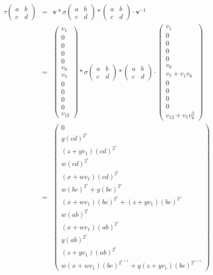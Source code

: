 \begin{eqnarray*}
\tau\left(\begin{matrix} a & b \\ c & d \end{matrix}\right) &=&
\mathbf{v}*\sigma\left(\begin{matrix} a & b \\ c & d \end{matrix}\right) *
\left(\begin{matrix} a & b \\ c & d \end{matrix}\right) \cdot \mathbf{v}^{-1}\\
&=&
\left(\begin{matrix} 
v_1  \\
0 \\
0 \\
0 \\
0 \\
v_6 \\
v_7 \\
0 \\
0 \\
0 \\
0 \\
v_{12}
\end{matrix}\right)
*\sigma\left(\begin{matrix} a & b \\ c & d \end{matrix}\right) *
\left(\begin{matrix} a & b \\ c & d \end{matrix}\right) \cdot 
\left(\begin{matrix} 
v_1  \\
0 \\
0 \\
0 \\
0 \\
v_6 \\
v_7 + v_1v_6 \\
0 \\
0 \\
0 \\
0 \\
v_{12} + v_1v_6^2
\end{matrix}\right)\\
&=&
\left(\begin{matrix}
0 \\
y(cd)^{2^s} \\
(z+yv_1)(cd)^{2^s} \\
w(cd)^{2^r} \\
(x+wv_1)(cd)^{2^r} \\
w(bc)^{2^r} + y(bc)^{2^s} \\
(x+wv_1)(bc)^{2^r} + (z+yv_1)(bc)^{2^s} \\
w(ab)^{2^r} \\
(x+wv_1)(ab)^{2^r}  \\
y(ab)^{2^s} \\
(z+yv_1)(ab)^{2^r} \\
w(x+wv_1)(bc)^{2^{r+1}} + y(z+yv_1)(bc)^{2^{s+1}}
\end{matrix}\right)
\end{eqnarray*}
